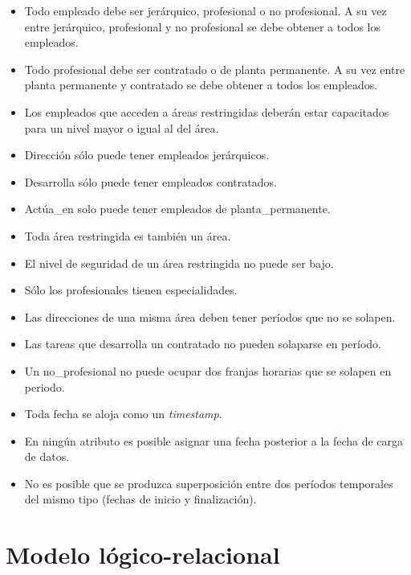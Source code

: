 \begin{itemize}
    \item Todo empleado debe ser jerárquico, profesional o no profesional. A su vez entre
          jerárquico, profesional y no profesional se debe obtener a todos los empleados.
    \item Todo profesional debe ser contratado o de planta permanente. A su vez entre
          planta permanente y contratado se debe obtener a todos los empleados.
    \item Los empleados que acceden a áreas restringidas deberán estar capacitados para
          un nivel mayor o igual al del área.
    \item Dirección sólo puede tener empleados jerárquicos.
    \item Desarrolla sólo puede tener empleados contratados.
    \item Actúa\_en solo puede tener empleados de planta\_permanente.
    \item Toda área restringida es también un área.
    \item El nivel de seguridad de un área restringida no puede ser bajo.
    \item Sólo los profesionales tienen especialidades.
    \item Las direcciones de una misma área deben tener períodos que no se solapen.
    \item Las tareas que desarrolla un contratado no pueden solaparse en período.
    \item Un no\_profesional no puede ocupar dos franjas horarias que se solapen en
          periodo.
    \item Toda fecha se aloja como un \textit{timestamp}.
    \item En ningún atributo es posible asignar una fecha posterior a la fecha de carga
          de datos.
    \item No es posible que se produzca superposición entre dos períodos temporales del
          mismo tipo (fechas de inicio y finalización).
\end{itemize}

\section{Modelo lógico-relacional}

\newcommand{\pk}[1]{\underline{#1}}
\newcommand{\fk}[1]{\dashuline{#1}}
\newcommand{\ent}[1]{\uppercase{\texttt{#1}}}
\newcommand{\att}[1]{\texttt{\makefirstuc{#1}}}
\newcommand{\CK}[1]{CK=\{(#1)\}}
\newcommand{\FK}[1]{FK=\{(#1)\}}
\newcommand{\PK}[1]{PK=\{(#1)\}}
\newcommand{\fmin}[2]{$F_{\text{mín}}$: \{#1\} $\rightarrow$ \{#2\}}

